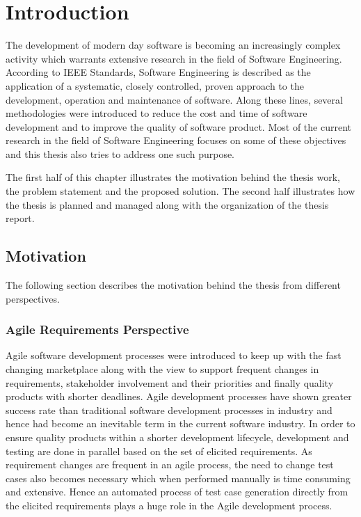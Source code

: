 
\chapter{Introduction}
The development of modern day software is becoming an increasingly complex activity which warrants extensive research in the field of Software Engineering. According to IEEE Standards, Software Engineering is described as the application of a systematic, closely controlled, proven approach to the development, operation and maintenance of software. Along these lines, several methodologies were introduced to reduce the cost and time of software development and to improve the quality of software product. Most of the current research in the field of Software Engineering focuses on some of these objectives and this thesis also tries to address one such purpose.

The first half of this chapter illustrates the motivation behind the thesis work, the problem statement and the proposed solution. The second half illustrates how the thesis is planned and managed along with the organization of the thesis report.
\section{Motivation}
The following section describes the motivation behind the thesis from different perspectives.
\subsection{Agile Requirements Perspective}
Agile software development processes \cite{ambler2009agile} were introduced to keep up with the fast changing marketplace along with the view to support frequent changes in requirements, stakeholder involvement and their priorities and finally quality products with shorter deadlines. Agile development processes have shown greater success rate than traditional software development processes in industry and hence had become an inevitable term in the current software industry. In order to ensure quality products within a shorter development lifecycle, development and testing are done in parallel based on the set of elicited requirements. As requirement changes are frequent in an agile process, the need to change test cases also becomes necessary which when performed manually is time consuming and extensive. Hence an automated process of test case generation directly from the elicited requirements plays a huge role in the Agile development process.
